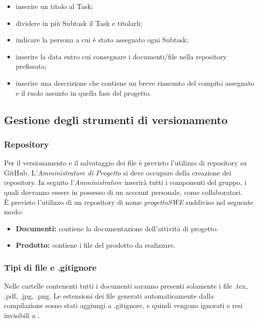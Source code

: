\documentclass[../NormediProgetto.tex]{subfiles}
\begin{document}
	\begin{itemize}
		\item inserire un titolo al Task;
		\item dividere in più Subtask il Task e titolarli;
		\item indicare la persona a cui è stato assegnato ogni Subtask;
		\item inserire la data entro cui consegnare i documenti/file nella repository prefissata;
		\item inserire una descrizione che contiene un breve riassunto del compito assegnato e il ruolo assunto in quella fase del progetto.
	\end{itemize}
	
	\subsection{Gestione degli strumenti di versionamento}
	
	\subsubsection{Repository}
	
	Per il versionamento e il salvataggio dei file è previsto l'utilizzo di repository su GitHub. L'\textit{Amministratore di Progetto} si deve occupare della creazione dei repository. In seguito l'\textit{Amministratore} inserirà tutti i componenti del gruppo, i quali dovranno essere in possesso di un account personale, come collaboratori.
	\\ \noindent È previsto l'utilizzo di un repository di nome \textit{progettoSWE} suddiviso nel seguente modo:
	
	\begin{itemize}	
		\item \textbf{Documenti:} contiene la documentazione dell'attività di progetto.
		\item \textbf{Prodotto:} contiene i file del prodotto da realizzare.
	\end{itemize}
	
	\subsubsection{Tipi di file e .gitignore}
	
	Nelle cartelle contenenti tutti i documenti saranno presenti solamente i file .tex, .pdf, .jpg, .png. Le estensioni dei file generati automaticamente dalla compilazione sosno stati aggiungi a .gitignore, e quindi vengono ignorati e resi invisibili a .
	
\end{document}

